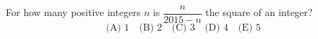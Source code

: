 For how many positive integers $n$ is $\dfrac{n}{2015-n}$ the square of an integer?
\[
\text{(A) }1\quad\text{(B) }2\quad\text{(C) }3\quad\text{(D) }4\quad\text{(E) }5
\]
